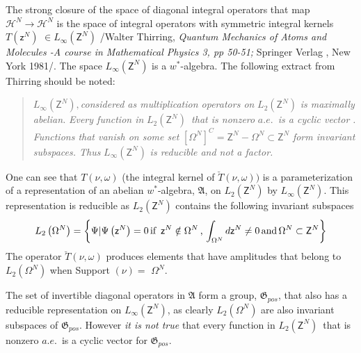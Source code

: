 \documentclass[aps,preprint]{revtex4}
\begin{document}
The strong closure of the space of diagonal integral operators that map $%
\mathcal{H}^{N}\rightarrow \mathcal{H}^{N}$ is the space of integral
operators with symmetric integral kernels $T\left( \mathsf{z}^{N}\right) $ $%
\in L_{\infty }\left( \mathsf{Z}^{N}\right) $ /Walter Thirring, \textit{%
Quantum Mechanics of Atoms and Molecules -A course in Mathematical Physics
3, pp 50-51; }Springer Verlag , New York 1981/. The space $L_{\infty }\left( 
\mathsf{Z}^{N}\right) $ is a $w^{\ast }$-algebra. The following extract from
Thirring should be noted:

\begin{quotation}
$L_{\infty }\left( \mathsf{Z}^{N}\right) ,$\textit{considered as
multiplication operators on} $L_{2}\left( \mathsf{Z}^{N}\right) $ \textit{is
maximally abelian. }\emph{Every function in }$L_{2}\left( \mathsf{Z}%
^{N}\right) $\emph{\ that is nonzero }$a.e.$\emph{\ is a cyclic vector}%
\textit{. Functions that vanish on some set} $\left[ \Omega ^{N}\right] ^{C}=%
\mathsf{Z}^{N}-\Omega ^{N}\subset \mathsf{Z}^{N}$ \textit{form invariant
subspaces. Thus} $L_{\infty }\left( \mathsf{Z}^{N}\right) $ \textit{is
reducible and not a factor.}\emph{\ }
\end{quotation}

One can see that $T\left( \nu ,\omega \right) $ (the integral kernel of $%
\breve{T}\left( \nu ,\omega \right) )$ is a parameterization of a
representation of an abelian $w^{\ast }$-algebra, $\mathfrak{A}$, on $%
L_{2}\left( \mathsf{Z}^{N}\right) $ by $L_{\infty }\left( \mathsf{Z}%
^{N}\right) $. This representation is reducible as $L_{2}\left( \mathsf{Z}%
^{N}\right) $ contains the following invariant subspaces 
\begin{equation}
L_{2}\left( \Omega ^{N}\right) =\left\{ \Psi |\Psi \left( \mathsf{z}%
^{N}\right) =0\,\text{if \thinspace }\mathsf{z}^{N}\notin \Omega ^{N}\,\text{%
,\thinspace }\int_{\Omega ^{N}}d\mathsf{z}^{N}\neq 0\,\text{and\thinspace }%
\Omega ^{N}\subset \mathsf{Z}^{N}\right\}
\end{equation}%
The operator $\breve{T}\left( \nu ,\omega \right) $ produces elements that
have amplitudes that belong to $L_{2}\left( \Omega ^{N}\right) $ when Support%
$\left( \nu \right) =$ $\Omega ^{N}$.

The set of invertible diagonal operators in $\mathfrak{A}$ form a group, $%
\mathfrak{G}_{pos}$, that also has a reducible representation on $L_{\infty
}\left( \mathsf{Z}^{N}\right) $, as clearly $L_{2}\left( \Omega ^{N}\right) $
are also invariant subspaces of $\mathfrak{G}_{pos}$. However \emph{it is
not true} that every function in $L_{2}\left( \mathsf{Z}^{N}\right) $\ that
is nonzero $a.e.$\ is a cyclic vector for $\mathfrak{G}_{pos}$.
\end{document}
